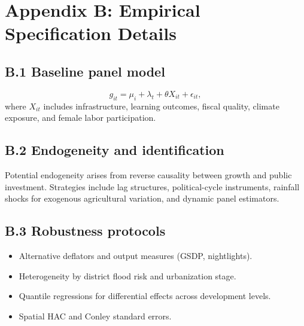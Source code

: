 \documentclass[preprint,12pt]{elsarticle}
\begin{document}
\section{Appendix B: Empirical Specification Details}
\subsection{B.1 Baseline panel model}
\begin{equation}
g_{it}=\mu_i+\lambda_t+\theta X_{it}+\epsilon_{it},
\end{equation}
where $X_{it}$ includes infrastructure, learning outcomes, fiscal quality, climate exposure, and female labor participation.

\subsection{B.2 Endogeneity and identification}
Potential endogeneity arises from reverse causality between growth and public investment. Strategies include lag structures, political-cycle instruments, rainfall shocks for exogenous agricultural variation, and dynamic panel estimators.

\subsection{B.3 Robustness protocols}
\begin{itemize}
\item Alternative deflators and output measures (GSDP, nightlights).
\item Heterogeneity by district flood risk and urbanization stage.
\item Quantile regressions for differential effects across development levels.
\item Spatial HAC and Conley standard errors.
\end{itemize}
\end{document}
